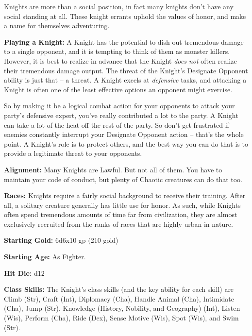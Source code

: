 
Knights are more than a social position, in fact many knights don't have any social standing at all. These knight errants uphold the values of honor, and make a name for themselves adventuring.

\textbf{Playing a Knight:} A Knight has the potential to dish out tremendous damage to a single opponent, and it is tempting to think of them as monster killers. However, it is best to realize in advance that the Knight \textit{does not} often realize their tremendous damage output. The threat of the Knight's Designate Opponent ability is just that -- a threat. A Knight excels at \textit{defensive} tasks, and attacking a Knight is often one of the least effective options an opponent might exercise.

So by making it be a logical combat action for your opponents to attack your party's defensive expert, you've really contributed a lot to the party. A Knight can take a lot of the heat off the rest of the party. So don't get frustrated if enemies constantly interrupt your Designate Opponent action -- that's the whole point. A Knight's role is to protect others, and the best way you can do that is to provide a legitimate threat to your opponents.

\textbf{Alignment:} Many Knights are Lawful. But not all of them. You have to maintain your code of conduct, but plenty of Chaotic creatures can do that too.

\textbf{Races:} Knights require a fairly social background to receive their training. After all, a solitary creature generally has little use for honor. As such, while Knights often spend tremendous amounts of time far from civilization, they are almost exclusively recruited from the ranks of races that are highly urban in nature.

\textbf{Starting Gold:} 6d6x10 gp (210 gold)

\textbf{Starting Age:} As Fighter.

\textbf{Hit Die:} d12

\textbf{Class Skills:} The Knight's class skills (and the key ability for each 
skill) are Climb (Str), Craft (Int), Diplomacy (Cha), Handle Animal (Cha), Intimidate 
(Cha), Jump (Str), Knowledge (History, Nobility, and Geography) (Int), Listen (Wis), 
Perform (Cha), Ride (Dex), Sense Motive (Wis), Spot (Wis), and Swim (Str).

